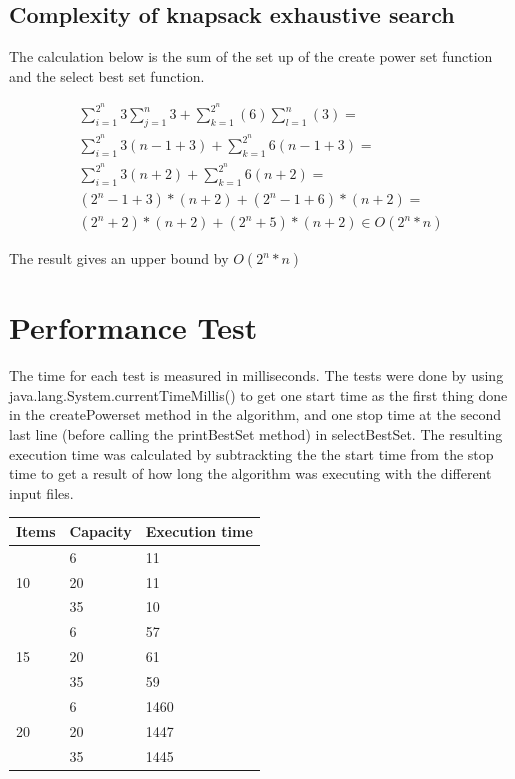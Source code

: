 \documentclass{inc/mas}
\begin{document}
\subsection{Complexity of knapsack exhaustive search}

The calculation below is the sum of the set up of the create power set function and the select best set function.

\begin{equation}
\begin{split}
\sum^{2^n}_{i =1}3\sum^n_{j=1}3+\sum^{2^n}_{k=1}(6)\sum^n_{l=1}(3)= \\
\sum^{2^n}_{i =1}3(n-1+3) + \sum^{2^n}_{k =1}6(n-1+3) =  \\
\sum^{2^n}_{i =1}3(n+2) + \sum^{2^n}_{k =1}6(n+2) = \\
(2^n-1+3)*(n+2) + (2^n-1+6)*(n+2) = \\
(2^n+2)*(n+2) + (2^n+5)*(n+2) \in O(2^n*n)
\end{split}
\end{equation}

The result gives an upper bound by $O(2^n*n)$



\section{Performance Test}

The time for each test is measured in milliseconds. The tests were done by using java.lang.System.currentTimeMillis() to get one start time as the first thing done in the createPowerset method in the algorithm, and one stop time at the second last line (before calling the printBestSet method) in selectBestSet. The resulting execution time was calculated by subtrackting the the start time from the stop time to get a result of how long the algorithm was executing with the different input files.\\

\begin{tabular}{|l|l|l|} \hline
Items &Capacity &Execution time\\ \hline
\multirow{3}{*}{10} & 6 & 11 \\
& 20 & 11 \\
& 35 & 10 \\ \hline
\multirow{3}{*}{15} & 6 & 57 \\
& 20 & 61 \\
& 35 & 59 \\ \hline
\multirow{3}{*}{20} & 6 & 1460 \\
& 20 & 1447 \\
& 35 & 1445 \\ \hline
\end{tabular}
\end{document}
